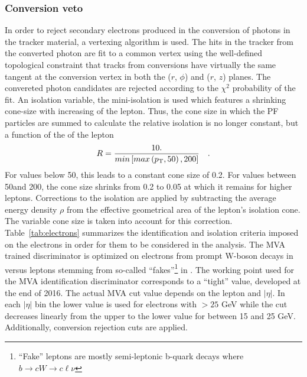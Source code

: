 \subsubsection*{Conversion veto}
\noindent\justify  
In order to reject secondary electrons produced in the conversion of photons in the tracker material, a vertexing algorithm is used. 
The hits in the tracker from the converted photon are fit to a common vertex using the well-defined topological constraint that tracks from conversions have virtually the same tangent at the conversion vertex in both the ($r$, $\phi$) and ($r$, $z$) planes. 
The convereted photon candidates are rejected according to the $\chi^{2}$ probability of the fit.
\newpara
\noindent\justify  
An isolation variable, the mini-isolation is used which features a shrinking cone-size with increasing \pt of the lepton. 
Thus, the cone size in which the PF particles are summed to calculate the relative isolation is no longer constant, but a function of the \pt of the lepton
\begin{equation*}
    R = \frac{10.}{min\left[ max \left( p_{\mathrm{T}}, 50 \right), 200 \right]} \quad.
\end{equation*}
For \pt values below 50\GeV, this leads to a constant cone size of 0.2. 
For \pt values between 50\GeV and 200\GeV, the cone size shrinks from 0.2 to 0.05 at which it remains for higher \pt leptons.
Corrections to the isolation are applied by subtracting the average energy density $\rho$ from the effective geometrical area of the lepton's isolation cone. 
The variable cone size is taken into account for this correction.
Table~\ref{tab:electrons} summarizes the identification and isolation criteria imposed on the electrons in order for them to be considered in the analysis. 
The MVA trained discriminator is optimized on electrons from prompt W-boson decays in \ttbar versus leptons stemming from so-called ``fakes''\footnote{``Fake'' leptons are mostly semi-leptonic b-quark decays where $b \rightarrow cW \rightarrow c\ell \nu$} in \ttbar. 
The working point used for the MVA identification discriminator corresponds to a ``tight'' value, developed at the end of 2016. 
The actual MVA cut value depends on the lepton \pt and $|\eta|$. 
In each $|\eta|$ bin the lower value is used for electrons with \pt $> 25$ GeV while the cut decreases linearly from the upper to the lower value for \pt between 15 and 25 GeV. 
Additionally, conversion rejection cuts are applied.                        
